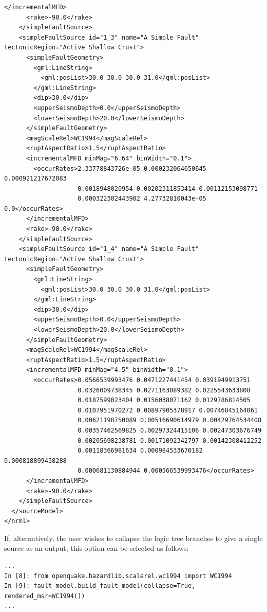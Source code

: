 \begin{Verbatim}[frame=single, commandchars=\\\{\}, fontsize=\scriptsize]
      </incrementalMFD>
      <rake>-90.0</rake>
    </simpleFaultSource>
    <simpleFaultSource id="1_3" name="A Simple Fault" tectonicRegion="Active Shallow Crust">
      <simpleFaultGeometry>
        <gml:LineString>
          <gml:posList>30.0 30.0 30.0 31.0</gml:posList>
        </gml:LineString>
        <dip>30.0</dip>
        <upperSeismoDepth>0.0</upperSeismoDepth>
        <lowerSeismoDepth>20.0</lowerSeismoDepth>
      </simpleFaultGeometry>
      <magScaleRel>WC1994</magScaleRel>
      <ruptAspectRatio>1.5</ruptAspectRatio>
      <incrementalMFD minMag="6.64" binWidth="0.1">
        <occurRates>2.33778843726e-05 0.000232064650645 0.000921217672083
                    0.0018948020954 0.00202311853414 0.00112153098771 
                    0.000322302443902 4.27732810043e-05 0.0</occurRates>
      </incrementalMFD>
      <rake>-90.0</rake>
    </simpleFaultSource>
    <simpleFaultSource id="1_4" name="A Simple Fault" tectonicRegion="Active Shallow Crust">
      <simpleFaultGeometry>
        <gml:LineString>
          <gml:posList>30.0 30.0 30.0 31.0</gml:posList>
        </gml:LineString>
        <dip>30.0</dip>
        <upperSeismoDepth>0.0</upperSeismoDepth>
        <lowerSeismoDepth>20.0</lowerSeismoDepth>
      </simpleFaultGeometry>
      <magScaleRel>WC1994</magScaleRel>
      <ruptAspectRatio>1.5</ruptAspectRatio>
      <incrementalMFD minMag="4.5" binWidth="0.1">
        <occurRates>0.0566539993476 0.0471227441454 0.0391949913751
                    0.0326009738345 0.0271163089382 0.0225543633808 
                    0.0187599023404 0.0156038071162 0.0129786814505
                    0.0107951970272 0.00897905378917 0.00746845164061
                    0.00621198750089 0.00516690614979 0.00429764534408
                    0.00357462569825 0.00297324415106 0.00247303676749
                    0.00205698238781 0.00171092342797 0.00142308412252
                    0.00118366981634 0.000984533670182 0.000818899438288
                    0.000681130884944 0.000566539993476</occurRates>
      </incrementalMFD>
      <rake>-90.0</rake>
    </simpleFaultSource>
  </sourceModel>
</nrml>
\end{Verbatim}

If, alternatively, the user wishes to collapse the logic tree branches to give a single source as an output, this option can be selected as follows:

\begin{Verbatim}[frame=single, commandchars=\\\{\}, fontsize=\scriptsize]
...
In [8]: from openquake.hazardlib.scalerel.wc1994 import WC1994
In [9]: fault_model.build_fault_model(collapse=True, rendered_msr=WC1994())
...
\end{Verbatim}

